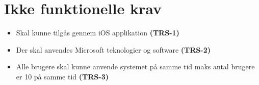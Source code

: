 \chapter{Ikke funktionelle krav}
\begin{itemize}[-]
	\itemsep 0.3em 
	\item Skal kunne tilgås gennem iOS applikation \textbf{(TRS-1)}
	\item Der skal anvendes Microsoft teknologier og software \textbf{(TRS-2)}
	\item Alle brugere skal kunne anvende systemet på samme tid maks antal brugere er 10 på samme tid \textbf{(TRS-3)}
\end{itemize}

\clearpage